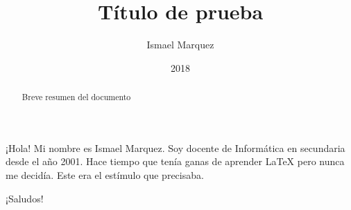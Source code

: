 \documentclass[a4paper,11pt]{article}
\title{\textbf{Título de prueba}}
\author{Ismael Marquez}
\date{2018}
\begin{document}
\maketitle
\thispagestyle{fancy}
\begin{abstract}
Breve resumen del documento
\end{abstract}

¡Hola! Mi nombre es Ismael Marquez. Soy docente de Informática en secundaria desde el año 2001. Hace tiempo que tenía ganas de aprender {\LaTeX} pero nunca me decidía. Este era el estímulo que precisaba.

¡Saludos!
\end{document}
